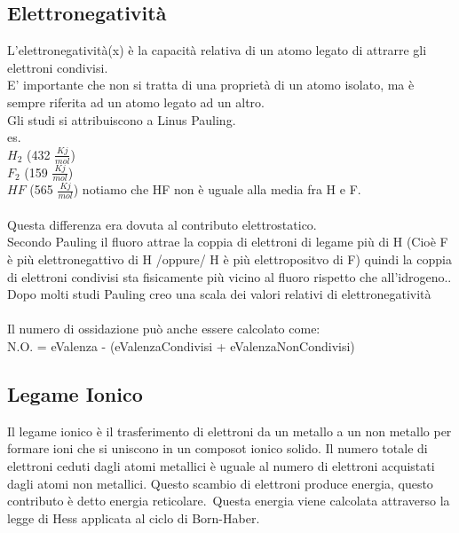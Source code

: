 \subsection{Elettronegatività}
L'elettronegatività(x) è la capacità relativa di un atomo legato di attrarre gli elettroni condivisi.\\
E' importante che non si tratta di una proprietà di un atomo isolato, ma è sempre riferita ad un atomo legato ad un altro.\\
Gli studi si attribuiscono a Linus Pauling.\\
es.\\
$H_2$ (432 $\frac{Kj}{mol}$)\\
$F_2$ (159 $\frac{Kj}{mol}$)\\
$HF$ (565 $\frac{Kj}{mol}$) notiamo che HF non è uguale alla media fra H e F.\\\\
Questa differenza era dovuta al contributo elettrostatico.\\
Secondo Pauling il fluoro attrae la coppia di elettroni di legame più di H (Cioè F è più elettronegattivo di H /oppure/ H è più elettropositvo di F) quindi la coppia di elettroni condivisi sta fisicamente più vicino al fluoro rispetto che all'idrogeno..\\
Dopo molti studi Pauling creo una scala dei valori relativi di elettronegatività\\\\
Il numero di ossidazione può anche essere calcolato come:\\
N.O. = eValenza - (eValenzaCondivisi + eValenzaNonCondivisi)
\subsection{Legame Ionico}
Il legame ionico è il trasferimento di elettroni da un metallo a un non metallo per formare ioni che si uniscono in un composot ionico solido. Il numero totale di elettroni ceduti dagli atomi metallici è uguale al numero di elettroni acquistati dagli atomi non metallici. Questo scambio di elettroni produce energia, questo contributo è detto energia reticolare.\
Questa energia viene calcolata attraverso la legge di Hess applicata al ciclo di Born-Haber.
